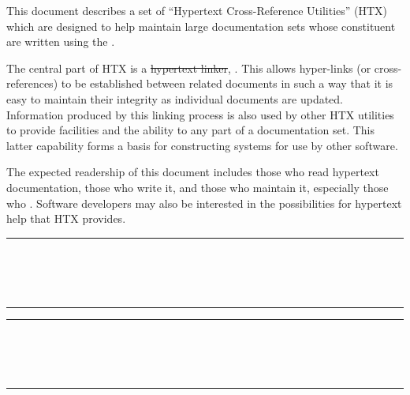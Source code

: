 This document describes a set of ``Hypertext Cross-Reference
Utilities'' (HTX) which are designed to help maintain large
documentation sets whose constituent  are written
using the .

The central part of HTX is a \st{hypertext linker},
. This allows hyper-links (or cross-references)
to be established between related documents in such a way that it is
easy to maintain their integrity as individual documents are updated.
Information produced by this linking process is also used by other HTX
utilities to provide  facilities and the ability to
 any part of a
documentation set. This latter capability forms a basis for
constructing  systems for
use by other software.

The expected readership of this document includes those who read
hypertext documentation, those who write it, and those who maintain
it, especially those who . Software developers may also be interested in
the possibilities for hypertext help that HTX provides.


\newpage
\begin{latexonly}
   \newpage
   \markright{\stardocname}
   \null\vspace{5mm}
   \begin {center}
   \rule{80mm}{0.5mm} \\ [1ex]
   {\Large\bf \stardoctitle \\ [2.5ex]
              \stardocversion} \\ [2ex]
   \rule{80mm}{0.5mm}
   \end{center}
   \setlength{\parskip}{0mm}
   \latexonlytoc
   \setlength{\parskip}{\medskipamount}
   \markright{\stardocname}
\end{latexonly}
\newpage
\renewcommand{\thepage}{\arabic{page}}
\setcounter{page}{1}
\begin{latexonly}
   \newpage
   \markright{\stardocname}
   \renewcommand{\thepage}{\arabic{page}}
   \setcounter{page}{1}
   \null\vspace{5mm}
   \begin{center}
   \rule{80mm}{0.5mm}\\[1ex]
   {\Large\bf \stardoctitle\\[2.5ex]
              \stardocversion}\\[2ex]
   \rule{80mm}{0.5mm}
   \end{center}
   \vspace{30mm}
\end{latexonly}

